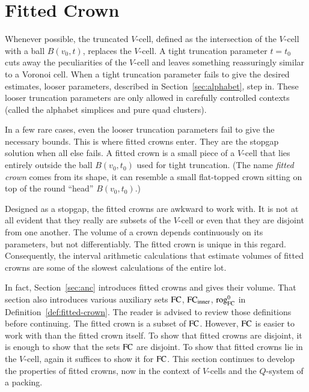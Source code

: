 



\section{Fitted Crown}%
    \label{sec:fine-overview}

Whenever possible, the truncated $V$-cell, defined as the intersection
of the $V$-cell with a ball $B(v_0,t)$,  replaces the 
$V$-cell.  A tight truncation parameter $t=t_0$ cuts away the peculiarities
of the $V$-cell and leaves something reassuringly similar to a Voronoi cell.
When a tight truncation parameter fails to give the desired estimates,
looser parameters, described in Section~\ref{sec:alphabet}, step in.  
These looser truncation parameters are only allowed in carefully controlled contexts (called the alphabet simplices and pure quad clusters).

In a few rare cases, even the looser truncation parameters fail to give the necessary bounds.  This is where fitted crowns enter.  They are the stopgap 
solution when all else fails.    A fitted crown is a small piece of a $V$-cell
that lies entirely outside the ball $B(v_0,t_0)$ used for tight truncation.
(The name {\it fitted crown} comes from its shape, it can resemble a small
flat-topped crown sitting on top of the round ``head'' $B(v_0,t_0)$.)

Designed as a stopgap, the fitted crowns are awkward to work with.
It is not at all evident that they really are subsets of the $V$-cell or even
that they are disjoint from one another.  The volume of a crown depends
continuously on its parameters, but not differentiably.  The fitted crown
is unique in this regard.
Consequently, the interval arithmetic calculations that estimate volumes
of fitted crowns are some of the slowest calculations of the entire lot.

In fact, 
Section~\ref{sec:anc} introduces fitted crowns and gives their volume. 
That section also introduces  
various auxiliary sets ${\operatorname{FC}}$, ${\operatorname{FC}}_{\text{inner}}$, ${\operatorname{rog}}^0_{\text{FC}}$ in
Definition~\ref{def:fitted-crown}.  The reader is advised to review those
definitions before continuing.  The fitted crown is a subset of ${\operatorname{FC}}$.
However, ${\operatorname{FC}}$ is easier to work with than the fitted crown itself.  
To show that fitted crowns are disjoint, it is enough to show that
the sets ${\operatorname{FC}}$ are disjoint.  To show that fitted crowns lie in the $V$-cell,
again it suffices to show it for ${\operatorname{FC}}$.  
This section continues to develop the
properties of fitted crowns, now
in the context of $V$-cells and the $Q$-system
of a packing.  



